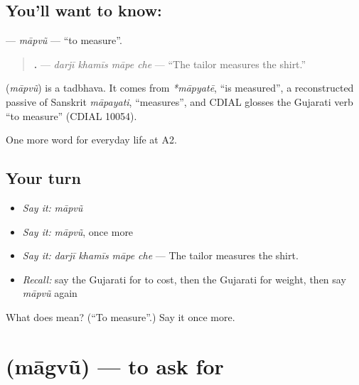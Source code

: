 \subsection*{You'll want to know: }
\textbf{} — \emph{māpvũ} — \textquotedblleft{}to measure\textquotedblright{}.

\begin{quote}
\textbf{   .} — \emph{darjī khamīs māpe che} — \textquotedblleft{}The tailor measures the shirt.\textquotedblright{}
\end{quote}

\begin{cousinweb}
\textbf{} (\emph{māpvũ}) is a tadbhava. It comes from \emph{*māpyatē}, \textquotedblleft{}is measured\textquotedblright{}, a reconstructed passive of Sanskrit \emph{māpayati}, \textquotedblleft{}measures\textquotedblright{}, and CDIAL glosses the Gujarati verb \textquotedblleft{}to measure\textquotedblright{} (CDIAL 10054).
\end{cousinweb}

\begin{grammarlens}[title={What you've built}]
One more word for everyday life at A2.
\end{grammarlens}

\subsection*{Your turn}
\begin{itemize}
\raggedright
  \item \emph{Say it:} \emph{māpvũ}
  \item \emph{Say it:} \emph{māpvũ}, once more
  \item \emph{Say it:} \emph{darjī khamīs māpe che} — The tailor measures the shirt.
  \item \emph{Recall:} say the Gujarati for to cost, then the Gujarati for weight, then say \emph{māpvũ} again
\end{itemize}

\begin{tcolorbox}[breakable,colback=teal!4,colframe=teal!35!black,title={Before you move on}]
What does  mean? (\textquotedblleft{}To measure\textquotedblright{}.) Say it once more.
\end{tcolorbox}
\section[\texorpdfstring{\gu{માગવું} (māgvũ)}{માગવું (māgvũ)}]{ (māgvũ) — to ask for}

